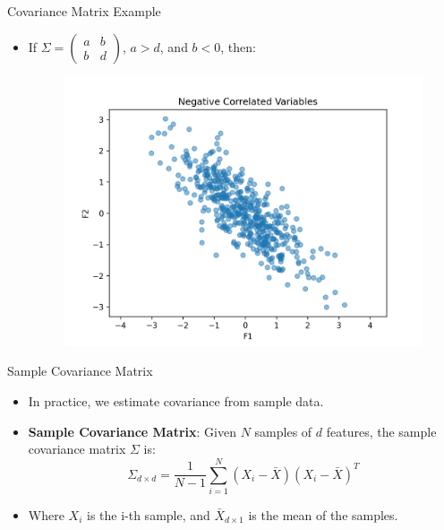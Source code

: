 \documentclass[serif, aspectratio=169]{beamer}
\begin{document}
\begin{frame}{Covariance Matrix Example}
    \begin{itemize}         
        \item If $\Sigma = 
\begin{pmatrix}
a & b  \\
b & d 
\end{pmatrix}$, $a > d$, and $b < 0$, then: 
        \begin{figure}[htpb]
            \begin{center}
         \includegraphics[keepaspectratio, scale=0.5]{pic/negative_correlated_variables.png}
            \end{center}
        \end{figure}
    \end{itemize}
\end{frame}


\begin{frame}{Sample Covariance Matrix}
    \begin{itemize}         
        \item In practice, we estimate covariance from sample data.
        \item \textbf{Sample Covariance Matrix}: Given $N$ samples of $d$ features, the sample covariance matrix $\Sigma$ is:
        $$
        \Sigma_{d\times d} = \frac{1}{N-1} \sum_{i=1}^{N} (X_i - \bar{X})(X_i - \bar{X})^T
        $$
        \item Where $X_i$  is the i-th sample, and $\bar{X}_{d \times 1}$
  is the mean of the samples.
    \end{itemize}
\end{frame}
\end{document}
